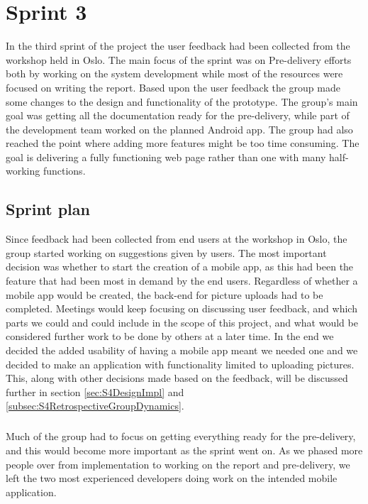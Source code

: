 \chapter{Sprint 3}
\label{chap:S4}

In the third sprint of the project the user feedback had been collected from the workshop held in Oslo. The main focus of the sprint was on Pre-delivery efforts both by working on the system development while most of the resources were focused on writing the report. Based upon the user feedback the group made some changes to the design and functionality of the prototype. The group's main goal was getting all the documentation ready for the pre-delivery, while part of the development team worked on the planned Android app. The group had also reached the point where adding more features might be too time consuming. The goal is delivering a fully functioning web page rather than one with many half-working functions.

\section{Sprint plan}
\label{sec:S4Plan}

Since feedback had been collected from end users at the workshop in Oslo, the group started working on suggestions given by users. The most important decision was whether to start the creation of a mobile app, as this had been the feature that had been most in demand by the end users. Regardless of whether a mobile app would be created, the back-end for picture uploads had to be completed. Meetings would keep focusing on discussing user feedback, and which parts we could and could include in the scope of this project, and what would be considered further work to be done by others at a later time. In the end we decided the added usability of having a mobile app meant we needed one and we decided to make an application with functionality limited to uploading pictures. This, along with other decisions made based on the feedback, will be discussed further in section \ref{sec:S4DesignImpl} and \ref{subsec:S4RetrospectiveGroupDynamics}.

\paragraph{} Much of the group had to focus on getting everything ready for the pre-delivery, and this would become more important as the sprint went on. As we phased more people over from implementation to working on the report and pre-delivery, we left the two most experienced developers doing work on the intended mobile application.

